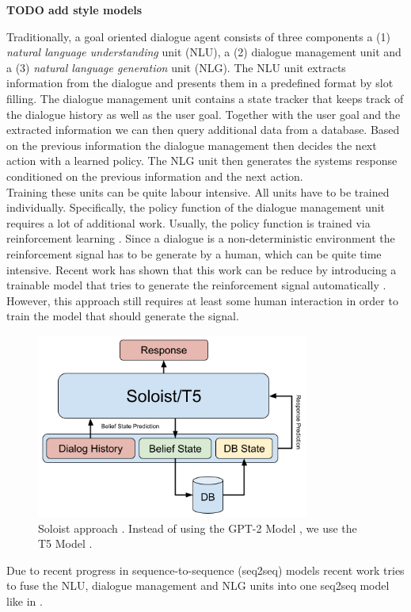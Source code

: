 \documentclass[twocolumn]{tum-article}
\begin{document}
\textbf{TODO add style models}

Traditionally, a goal oriented dialogue agent consists of three components a (1) \textit{natural language understanding} unit (NLU), a (2) dialogue management unit and a (3) \textit{natural language generation} unit (NLG). The NLU unit extracts information from the dialogue and presents them in a predefined format by slot filling. The dialogue management unit contains a state tracker that keeps track of the dialogue history as well as the user goal. Together with the user goal and the extracted information we can then query additional data from a database. Based on the previous information the dialogue management then decides the next action with a learned policy. The NLG unit then generates the systems response conditioned on the previous information and the next action.\\
Training these units can be quite labour intensive. All units have to be trained individually. Specifically, the policy function of the dialogue management unit requires a lot of additional work. Usually, the policy function is trained via reinforcement learning \cite{DBLP:journals/ml/Williams92}. Since a dialogue is a non-deterministic environment the reinforcement signal has to be generate by a human, which can be quite time intensive. Recent work has shown that this work can be reduce by introducing a trainable model that tries to generate the reinforcement signal automatically \cite{DBLP:journals/corr/abs-1907-00448}. However, this approach still requires at least some human interaction in order to train the model that should generate the signal.\\
\begin{figure}[!h]
\centering
\includegraphics[width=0.8\textwidth]{figures/Soloist.png}
\caption{Soloist approach \cite{peng2020soloist}. Instead of using the GPT-2 Model \cite{radford2019language}, we use the T5 Model \cite{raffel2019exploring}.}
\label{fig:soloist}
\end{figure}
Due to recent progress in sequence-to-sequence (seq2seq) models \cite{radford2019language, raffel2019exploring} recent work tries to fuse the NLU, dialogue management and NLG units into one seq2seq model like in \cite{peng2020soloist}.  
\end{document}
